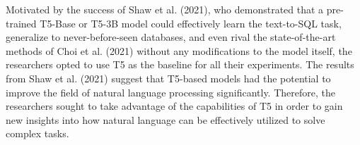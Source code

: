 Motivated by the success of Shaw et al. (2021)\cite{shaw-etal-2021-compositional}, who demonstrated that a pre-trained T5-Base or T5-3B model could effectively learn the text-to-SQL task, generalize to never-before-seen databases, and even rival the state-of-the-art methods of Choi et al. (2021)\cite{10.1162/coli_a_00403} without any modifications to the model itself, the researchers opted to use T5 as the baseline for all their experiments. The results from Shaw et al. (2021)\cite{shaw-etal-2021-compositional} suggest that T5-based models had the potential to improve the field of natural language processing significantly. Therefore, the researchers sought to take advantage of the capabilities of T5 in order to gain new insights into how natural language can be effectively utilized to solve complex tasks.